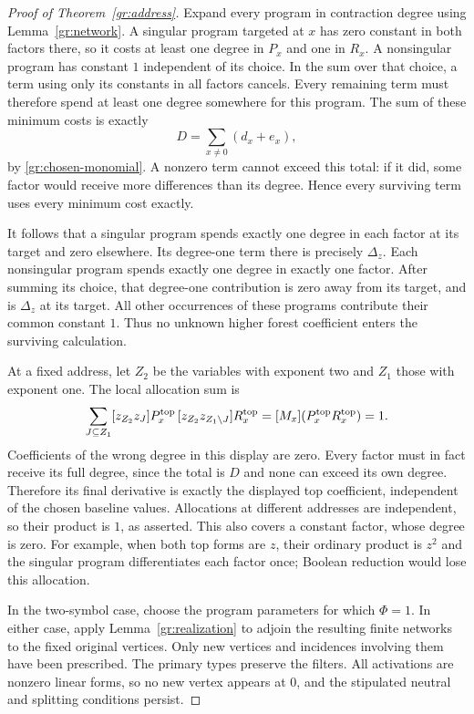 \begin{proof}[Proof of Theorem~\ref{gr:address}]
Expand every program in contraction degree using
Lemma~\ref{gr:network}.  A singular program targeted at $x$ has zero
constant in both factors there, so it costs at least one degree in
$P_x$ and one in $R_x$.  A nonsingular program has constant $1$
independent of its choice.  In the sum over that choice, a term using
only its constants in all factors cancels.  Every remaining term must
therefore spend at least one degree somewhere for this program.  The
sum of these minimum costs is exactly
\begin{equation}\label{gr:budget}
 D=\sum_{x\ne0}(d_x+e_x),
\end{equation}
by \eqref{gr:chosen-monomial}.  A nonzero term cannot exceed this total:
if it did, some factor would receive more differences than its degree.
Hence every surviving term uses every minimum cost exactly.

It follows that a singular program spends exactly one degree in each
factor at its target and zero elsewhere.  Its degree-one term there
is precisely $\Delta_z$.  Each nonsingular program spends exactly one
degree in exactly one factor.  After summing its choice, that
degree-one contribution is zero away from its target, and is
$\Delta_z$ at its target.  All other occurrences of these programs
contribute their common constant $1$.  Thus no unknown higher forest
coefficient enters the surviving calculation.

At a fixed address, let $Z_2$ be the variables with exponent two and
$Z_1$ those with exponent one.  The local allocation sum is
\[
 \sum_{J\subseteq Z_1}
 [z_{Z_2}z_J]P_x^{\rm top}\,
 [z_{Z_2}z_{Z_1\setminus J}]R_x^{\rm top}
   =[M_x](P_x^{\rm top}R_x^{\rm top})=1.
\]
Coefficients of the wrong degree in this display are zero.  Every
factor must in fact receive its full degree, since the total is $D$
and none can exceed its own degree.  Therefore its final derivative
is exactly the displayed top coefficient, independent of the chosen
baseline values.  Allocations at different addresses are independent,
so their product is $1$, as asserted.  This also covers a constant
factor, whose degree is zero.  For example, when both top forms are
$z$, their ordinary product is $z^2$ and the singular program
differentiates each factor once; Boolean reduction would lose this
allocation.

In the two-symbol case, choose the program parameters for which
$\Phi=1$.  In either case, apply Lemma~\ref{gr:realization} to adjoin
the resulting finite networks to
the fixed original vertices.  Only new vertices and incidences involving
them have been prescribed.  The primary types preserve the filters.
All activations are nonzero linear forms,
so no new vertex appears at $0$, and the stipulated neutral and
splitting conditions persist.
\end{proof}

